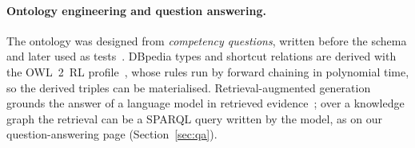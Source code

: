 \paragraph{Ontology engineering and question answering.} The ontology was
designed from \emph{competency questions}, written before the schema and later
used as tests~\cite{gruninger1995methodology}. DBpedia types and shortcut
relations are derived with the OWL~2~RL profile~\cite{motik2012owl2profiles},
whose rules run by forward chaining in polynomial time, so the derived triples
can be materialised. Retrieval-augmented generation grounds the answer of a
language model in retrieved evidence~\cite{lewis2020rag}; over a knowledge
graph the retrieval can be a SPARQL query written by the model, as on our
question-answering page (Section~\ref{sec:qa}).
